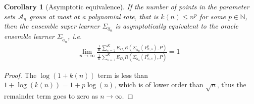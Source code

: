 \documentclass[11pt, a4paper]{article}
\newtheorem{corollary}[theorem]{Corollary}
\theoremstyle{definition}
\theoremstyle{remark}
\newcommand{\esl}{\Sigma}
\begin{document}
\begin{corollary}[Asymptotic equivalence]
    If the number of points in the parameter sets $ \mathcal{A}_n $ grows at most at a polynomial rate, that is $ k(n) \leq n^{p} $ for some $ p \in \mathbb{N} $, then the ensemble super learner $ \esl_{ \hat{a}_n } $ is asymptotically equivalent to the oracle ensemble learner $ \esl_{ \tilde{a}_n } $, i.e.
    \begin{align*}
        \lim_{n \to \infty} \frac{\frac{1}{K} \sum_{s = 1}^{K} E_{D_n} R(\esl_{ \hat{a}_n }(P_{n, s}^{0}) , P)}{\frac{1}{K} \sum_{s = 1}^{K} E_{D_n} R(\esl_{ \tilde{a}_n }(P_{n,s}^{0}), P)} = 1
    \end{align*}
\end{corollary}
\begin{proof}
    The $ \log(1 + k(n)) $ term is less than $ 1 + \log(k(n)) = 1 + p \log(n) $, which is of lower order than $ \sqrt{n} $, thus the remainder term goes to zero as $ n \to \infty $.
\end{proof}
\end{document}
